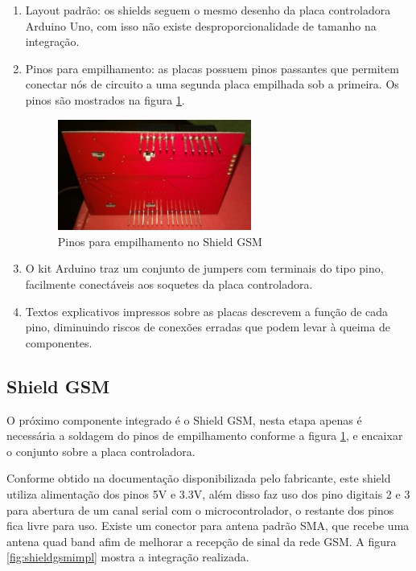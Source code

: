 \begin{enumerate}
	\item Layout padrão: os shields seguem o mesmo desenho da placa controladora Arduino Uno, com isso não existe desproporcionalidade de tamanho na integração.
	\item Pinos para empilhamento: as placas possuem pinos passantes que permitem conectar nós de circuito a uma segunda placa empilhada sob a primeira. Os pinos são mostrados na figura \ref{fig:empilpin}.
	
\begin{figure}[!htb]
	\centering
	\includegraphics[width=0.6\textwidth]{figures/stackPins.jpg}
	\caption{Pinos para empilhamento no Shield GSM}
	\label{fig:empilpin}
\end{figure}	

	\item O kit Arduino traz um conjunto de jumpers com terminais do tipo pino, facilmente conectáveis aos soquetes da placa controladora.
	\item Textos explicativos impressos sobre as placas descrevem a função de cada pino, diminuindo riscos de conexões erradas que podem levar à queima de componentes.
	
\end{enumerate}

\subsection{Shield GSM}

O próximo componente integrado é o Shield GSM, nesta etapa apenas é necessária a soldagem do pinos de empilhamento conforme a figura \ref{fig:empilpin}, e encaixar o conjunto sobre a placa controladora.

Conforme obtido na documentação disponibilizada pelo fabricante, este shield utiliza alimentação dos pinos 5V e 3.3V, além disso faz uso dos pino digitais 2 e 3 para abertura de um canal serial com o microcontrolador, o restante dos pinos fica livre para uso. Existe um conector para antena padrão SMA, que recebe uma antena quad band afim de melhorar a recepção de sinal da rede GSM. A figura \ref{fig:shieldgsmimpl} mostra a integração realizada.
 
